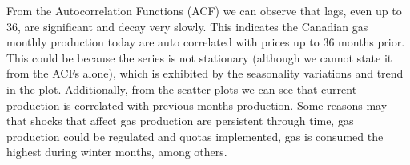 \documentclass[
]{article}
\begin{document}
From the Autocorrelation Functions (ACF) we can observe that lags, even
up to 36, are significant and decay very slowly. This indicates the
Canadian gas monthly production today are auto correlated with prices up
to 36 months prior. This could be because the series is not stationary
(although we cannot state it from the ACFs alone), which is exhibited by
the seasonality variations and trend in the plot. Additionally, from the
scatter plots we can see that current production is correlated with
previous months production. Some reasons may that shocks that affect gas
production are persistent through time, gas production could be
regulated and quotas implemented, gas is consumed the highest during
winter months, among others.
\end{document}
